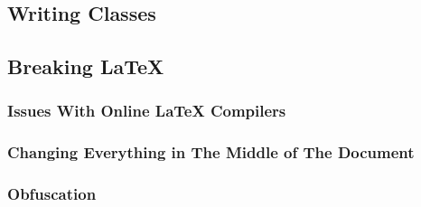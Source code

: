 \subsection{Writing Classes}


\subsection{Breaking \LaTeX}
\subsubsection{Issues With Online \LaTeX{} Compilers}
\subsubsection{Changing Everything in The Middle of The Document}
\subsubsection{Obfuscation}